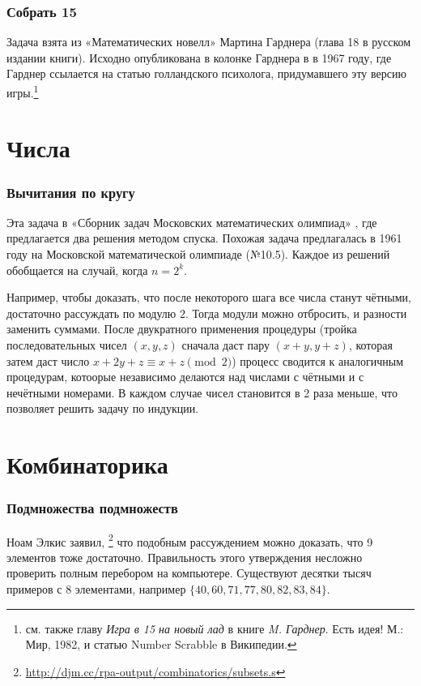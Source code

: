 \documentclass[twoside]{book}
\begin{document}
\subsubsection*{Собрать 15} %
Задача взята из «Математических новелл» Мартина Гарднера (глава 18 в русском издании книги). Исходно опубликована в колонке Гарднера в  в 1967 году, где Гарднер ссылается на статью голландского психолога, придумавшего эту версию игры.\footnote{см. также главу \emph{Игра в 15 на новый лад} в книге \emph{M. Гарднер}. Есть идея! М.: Мир, 1982, и статью Number Scrabble в Википедии.}

\section{Числа}

\subsubsection*{Вычитания по кругу}
Эта задача  в «Сборник задач Московских математических олимпиад» \cite[№257, с. 73]{сборникМ}, где предлагается два решения методом спуска.
Похожая задача предлагалась в 1961 году на Московской математической олимпиаде (№10.5). 
Каждое из решений обобщается на случай, когда $n=2^k$.

Например, чтобы доказать, что после некоторого шага все числа станут чётными, достаточно рассуждать по модулю $2$.
Тогда модули можно отбросить, и разности  заменить суммами.
После двукратного применения процедуры (тройка последовательных чисел $(x,y,z)$ сначала даст пару $(x+y,y+z)$, которая затем даст число $x+2y+z\equiv x+z \pmod{2}$) процесс сводится к аналогичным  процедурам, котоорые независимо делаются над числами с чётными и с нечётными номерами. В каждом случае чисел становится в 2 раза меньше, что позволяет решить задачу по индукции.


\section{Комбинаторика}

\subsubsection*{Подмножества подмножеств}
Ноам Элкис заявил,%
\footnote{\url{http://djm.cc/rpa-output/combinatorics/subsets.s}} что подобным рассуждением можно доказать, что 9 элементов тоже достаточно.
Правильность этого утверждения несложно проверить полным перебором на компьютере.
Существуют десятки тысяч примеров с 8 элементами, например $\{40,60,71,77,80,82,83,84\}$. 
\end{document}
